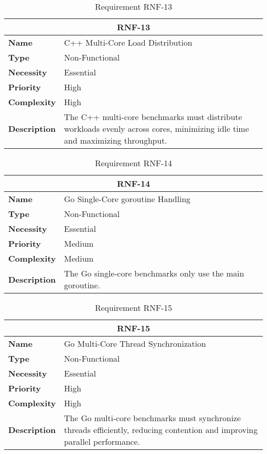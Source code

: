 \begin{table}[H]
    \centering
    \begin{tabular}{l p{10cm}}
        \toprule
        \multicolumn{2}{c}{\textbf{RNF-13}} \\
        \toprule
        \textbf{Name}         & C++ Multi-Core Load Distribution \\
        \textbf{Type}         & Non-Functional \\
        \textbf{Necessity}    & Essential \\
        \textbf{Priority}     & High \\
        \textbf{Complexity}   & High \\
        \textbf{Description}  & The C++ multi-core benchmarks must distribute workloads evenly across cores, minimizing idle time and maximizing throughput. \\
        \bottomrule
    \end{tabular}
\caption{Requirement RNF-13}\label{tab:rnf-13}
\end{table}

\begin{table}[H]
    \centering
    \begin{tabular}{l p{10cm}}
        \toprule
        \multicolumn{2}{c}{\textbf{RNF-14}} \\
        \toprule
        \textbf{Name}         & Go Single-Core \Gls{goroutine} Handling \\
        \textbf{Type}         & Non-Functional \\
        \textbf{Necessity}    & Essential \\
        \textbf{Priority}     & Medium \\
        \textbf{Complexity}   & Medium \\
        \textbf{Description}  & The Go single-core benchmarks only use the main \gls{goroutine}. \\
        \bottomrule
    \end{tabular}
\caption{Requirement RNF-14}\label{tab:rnf-14}
\end{table}

\begin{table}[H]
    \centering
    \begin{tabular}{l p{10cm}}
        \toprule
        \multicolumn{2}{c}{\textbf{RNF-15}} \\
        \toprule
        \textbf{Name}         & Go Multi-Core Thread Synchronization \\
        \textbf{Type}         & Non-Functional \\
        \textbf{Necessity}    & Essential \\
        \textbf{Priority}     & High \\
        \textbf{Complexity}   & High \\
        \textbf{Description}  & The Go multi-core benchmarks must synchronize threads efficiently, reducing contention and improving parallel performance. \\
        \bottomrule
    \end{tabular}
\caption{Requirement RNF-15}\label{tab:rnf-15}
\end{table}

